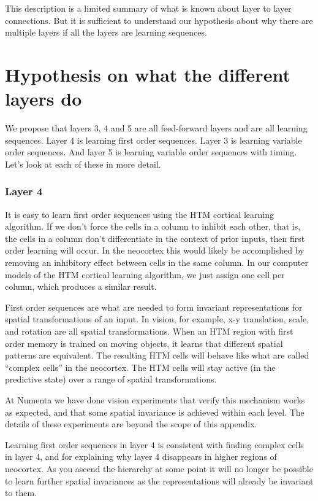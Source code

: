 \documentclass{report}
\begin{document}
This description is a limited summary of what is known about layer to
layer connections. But it is sufficient to understand our hypothesis
about why there are multiple layers if all the layers are learning
sequences.

\section*{Hypothesis on what the different layers do}

We propose that layers 3, 4 and 5 are all feed-forward layers and are
all learning sequences. Layer 4 is learning first order
sequences. Layer 3 is learning variable order sequences. And layer 5
is learning variable order sequences with timing. Let's look at each
of these in more detail.

\subsubsection*{Layer 4}
It is easy to learn first order sequences using the HTM cortical
learning algorithm. If we don't force the cells in a column to inhibit
each other, that is, the cells in a column don't differentiate in the
context of prior inputs, then first order learning will occur. In the
neocortex this would likely be accomplished by removing an inhibitory
effect between cells in the same column. In our computer models of the
HTM cortical learning algorithm, we just assign one cell per column,
which produces a similar result.

First order sequences are what are needed to form invariant
representations for spatial transformations of an input. In vision,
for example, x-y translation, scale, and rotation are all spatial
transformations. When an HTM region with first order memory is trained
on moving objects, it learns that different spatial patterns are
equivalent. The resulting HTM cells will behave like what are called
``complex cells'' in the neocortex. The HTM cells will stay active (in
the predictive state) over a range of spatial transformations.

At Numenta we have done vision experiments that verify this mechanism
works as expected, and that some spatial invariance is achieved within
each level. The details of these experiments are beyond the scope of
this appendix.

Learning first order sequences in layer 4 is consistent with finding
complex cells in layer 4, and for explaining why layer 4 disappears in
higher regions of neocortex. As you ascend the hierarchy at some point
it will no longer be possible to learn further spatial invariances as
the representations will already be invariant to them.
\end{document}
